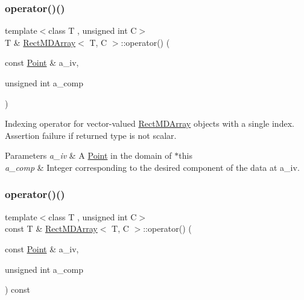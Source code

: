 \subsubsection{\texorpdfstring{operator()()}{operator()()}\hspace{0.1cm}{\footnotesize\ttfamily [1/2]}}
{\footnotesize\ttfamily template$<$class T , unsigned int C$>$ \\
T \& \hyperlink{class_rect_m_d_array}{Rect\+M\+D\+Array}$<$ T, C $>$\+::operator() (\begin{DoxyParamCaption}\item[{const \hyperlink{class_point}{Point} \&}]{a\+\_\+iv,  }\item[{unsigned int}]{a\+\_\+comp }\end{DoxyParamCaption})\hspace{0.3cm}{\ttfamily [inline]}}



Indexing operator for vector-\/valued \hyperlink{class_rect_m_d_array}{Rect\+M\+D\+Array} objects with a single index. Assertion failure if returned type is not scalar. 


\begin{DoxyParams}{Parameters}
{\em a\+\_\+iv} & A \hyperlink{class_point}{Point} in the domain of $\ast$this \\
\hline
{\em a\+\_\+comp} & Integer corresponding to the desired component of the data at a\+\_\+iv. \\
\hline
\end{DoxyParams}
\mbox{\label{class_rect_m_d_array_a9b2580f04b9b32089d04826aec554ff9}} 
\subsubsection{\texorpdfstring{operator()()}{operator()()}\hspace{0.1cm}{\footnotesize\ttfamily [2/2]}}
{\footnotesize\ttfamily template$<$class T , unsigned int C$>$ \\
const T \& \hyperlink{class_rect_m_d_array}{Rect\+M\+D\+Array}$<$ T, C $>$\+::operator() (\begin{DoxyParamCaption}\item[{const \hyperlink{class_point}{Point} \&}]{a\+\_\+iv,  }\item[{unsigned int}]{a\+\_\+comp }\end{DoxyParamCaption}) const\hspace{0.3cm}{\ttfamily [inline]}}



